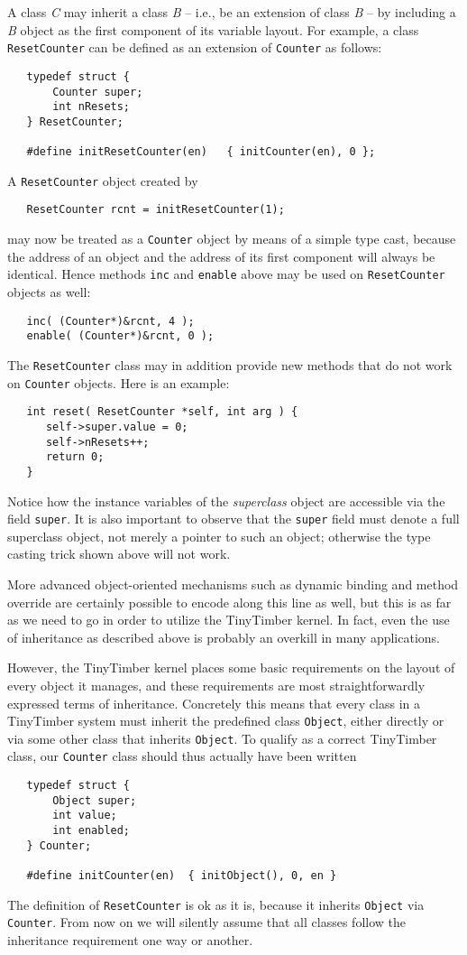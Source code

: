\documentclass[12pt]{article}
\begin{document}
A class {\em C} may inherit a class {\em B} -- i.e., be an extension of class {\em B} -- by including a {\em B} object as the first component of its variable layout.  For example, a class {\tt ResetCounter} can be defined as an extension of {\tt Counter} as follows:
\begin{verbatim}
   typedef struct {
       Counter super;
       int nResets;
   } ResetCounter;
   
   #define initResetCounter(en)   { initCounter(en), 0 };
\end{verbatim}
A {\tt ResetCounter} object created by
\begin{verbatim}
   ResetCounter rcnt = initResetCounter(1);
\end{verbatim}
may now be treated as a {\tt Counter} object by means of a simple type cast, because the address of an object and the address of its first component will always be identical.  Hence methods {\tt inc} and {\tt enable} above may be used on {\tt ResetCounter} objects as well:
\begin{verbatim}
   inc( (Counter*)&rcnt, 4 );
   enable( (Counter*)&rcnt, 0 );
\end{verbatim}
The {\tt ResetCounter} class may in addition provide new methods that do not work on {\tt Counter} objects.  Here is an example:
\begin{verbatim}
   int reset( ResetCounter *self, int arg ) {
      self->super.value = 0;
      self->nResets++;
      return 0;
   }
\end{verbatim}
Notice how the instance variables of the {\em superclass} object are accessible via the field {\tt super}.  It is also important to observe that the {\tt super} field must denote a full superclass object, not merely a pointer to such an object; otherwise the type casting trick shown above will not work.

More advanced object-oriented mechanisms such as dynamic binding and method override are certainly possible to encode along this line as well, but this is as far as we need to go in order to utilize the TinyTimber kernel.  In fact, even the use of inheritance as described above is probably an overkill in many applications.  

However, the TinyTimber kernel places some basic requirements on the layout of every object it manages, and these requirements are most straightforwardly expressed terms of inheritance.  Concretely this means that every class in a TinyTimber system must inherit the predefined class {\tt Object}, either directly or via some other class that inherits {\tt Object}.  To qualify as a correct TinyTimber class, our {\tt Counter} class should thus actually have been written
\begin{verbatim}
   typedef struct {
       Object super;
       int value;
       int enabled;
   } Counter;
   
   #define initCounter(en)  { initObject(), 0, en }
\end{verbatim}
The definition of {\tt ResetCounter} is ok as it is, because it inherits {\tt Object} via {\tt Counter}.  From now on we will silently assume that all classes follow the inheritance requirement one way or another.
\end{document}
